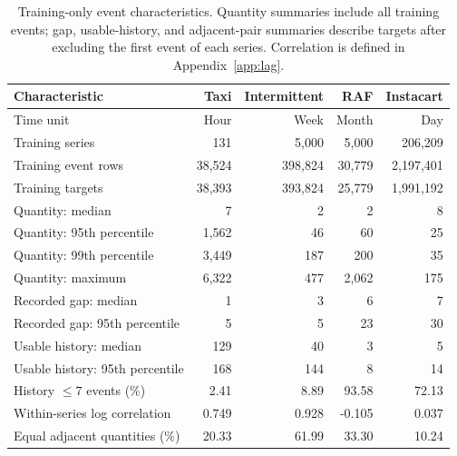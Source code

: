 \begin{table}[t]
\caption{Training-only event characteristics. Quantity summaries include all
training events; gap, usable-history, and adjacent-pair summaries describe
targets after excluding the first event of each series. Correlation is
defined in Appendix~\ref{app:lag}.}
\label{tab:train-characteristics}
\centering\scriptsize
\setlength{\tabcolsep}{4pt}
\begin{tabular}{@{}lrrrr@{}}
\toprule
Characteristic & Taxi & Intermittent & RAF & Instacart\\
\midrule
Time unit & Hour & Week & Month & Day\\
Training series & 131 & 5,000 & 5,000 & 206,209\\
Training event rows & 38,524 & 398,824 & 30,779 & 2,197,401\\
Training targets & 38,393 & 393,824 & 25,779 & 1,991,192\\
Quantity: median & 7 & 2 & 2 & 8\\
Quantity: 95th percentile & 1,562 & 46 & 60 & 25\\
Quantity: 99th percentile & 3,449 & 187 & 200 & 35\\
Quantity: maximum & 6,322 & 477 & 2,062 & 175\\
Recorded gap: median & 1 & 3 & 6 & 7\\
Recorded gap: 95th percentile & 5 & 5 & 23 & 30\\
Usable history: median & 129 & 40 & 3 & 5\\
Usable history: 95th percentile & 168 & 144 & 8 & 14\\
History $\leq7$ events (\%) & 2.41 & 8.89 & 93.58 & 72.13\\
Within-series log correlation & 0.749 & 0.928 & -0.105 & 0.037\\
Equal adjacent quantities (\%) & 20.33 & 61.99 & 33.30 & 10.24\\
\bottomrule
\end{tabular}
\end{table}

